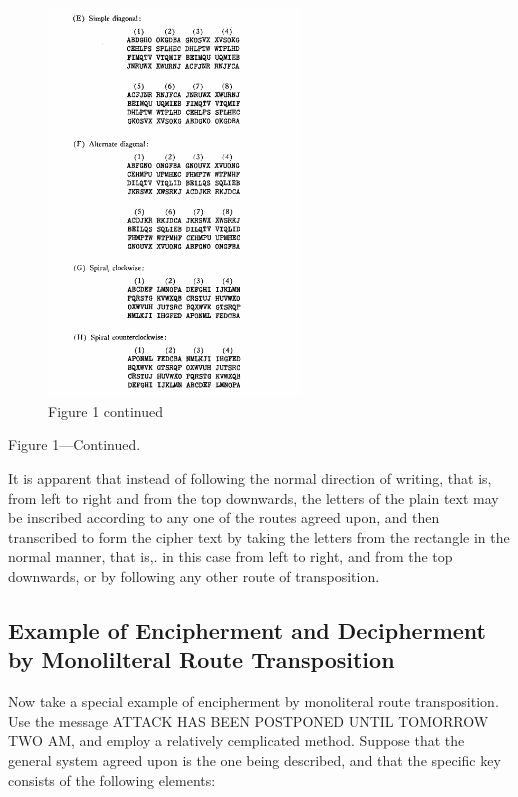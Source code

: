 \begin{figure}[h]
  \centering
    \includegraphics[width=0.6\textwidth,natwidth=481,natheight=736]{Chapter2_fig1Continued.png}
    \caption{Figure 1 continued}
\end{figure}

Figure 1—Continued.

\mypara It is apparent that instead of following the normal direction of
writing, that is, from left to right and from the top downwards, the
letters of the plain text may be inscribed according to any one of the
routes agreed upon, and then transcribed to form the cipher text by
taking the letters from the rectangle in the normal manner, that is,. in
this case from left to right, and from the top downwards, or by following any other route of transposition.

\subsection{Example of Encipherment and Decipherment by Monolilteral Route Transposition}

\mypara Now take a special example of encipherment by monoliteral route
transposition. Use the message ATTACK HAS BEEN POSTPONED
UNTIL TOMORROW TWO AM, and employ a relatively cemplicated
method. Suppose that the general system agreed upon is the one being
described, and that the specific key consists of the following elements:

